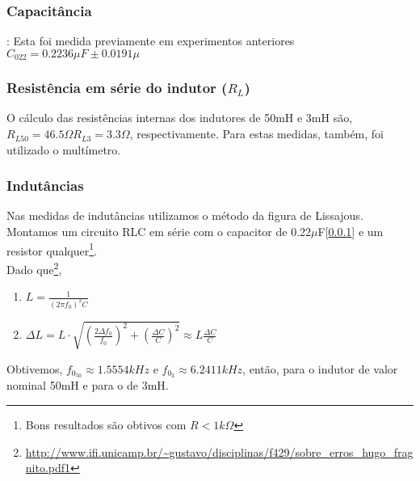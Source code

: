 \documentclass[12pt,letterpaper]{article}
\begin{document}
\subsubsection{Capacitância} \label{itm:ccap}: Esta foi medida previamente em experimentos anteriores $C_{022} = 0.2236\mu F \pm 0.0191\mu$
\subsubsection{Resistência em série do indutor ($R_L$)} \label{itm:rindutor}  O cálculo das resistências internas dos indutores de 50mH e 3mH são, $R_{L50} = 46.5\Omega R_{L3} = 3.3\Omega$, respectivamente. Para estas medidas, também, foi utilizado o multímetro.
\subsubsection{Indutâncias} \label{itm:iindutor} Nas medidas de indutâncias utilizamos o método da figura de Lissajous. Montamos um circuito RLC em série com o capacitor de 0.22$\mu$F[\ref{itm:ccap}] e um resistor qualquer\footnote{Bons resultados são obtivos com $R < 1k\Omega$}.\\
Dado que\footnote{\url{http://www.ifi.unicamp.br/~gustavo/disciplinas/f429/sobre_erros_hugo_fragnito.pdf1}},
\begin{enumerate}[I]
\item $L = \frac{1}{(2\pi f_0)^2 C}$ 
\item $\Delta{L} = L \cdot \sqrt{(\frac{2\Delta f_0}{f_0})^2 + (\frac{\Delta C}{C})^2} \approx L \frac{\Delta C}{C}$
\end{enumerate}
Obtivemos, $f_{0_{50}} \approx 1.5554kHz$ e $f_{0_3} \approx 6.2411kHz$, então,  para o indutor de valor nominal 50mH e  para o de 3mH.
\end{document}
